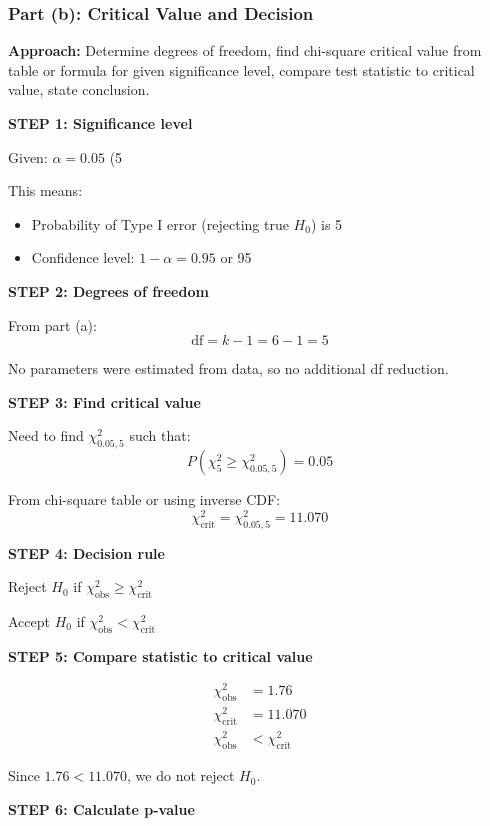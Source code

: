\documentclass[12pt]{article}
\begin{document}
\subsubsection{Part (b): Critical Value and Decision}

\begin{solution}

\textbf{Approach:} Determine degrees of freedom, find chi-square critical value from table or formula for given significance level, compare test statistic to critical value, state conclusion.

\textbf{STEP 1: Significance level}

Given: $\alpha = 0.05$ (5%

This means:
\begin{itemize}
    \item Probability of Type I error (rejecting true $H_0$) is 5%
    \item Confidence level: $1 - \alpha = 0.95$ or 95%
\end{itemize}

\textbf{STEP 2: Degrees of freedom}

From part (a):
\[
\text{df} = k - 1 = 6 - 1 = 5
\]

No parameters were estimated from data, so no additional df reduction.

\textbf{STEP 3: Find critical value}

Need to find $\chi^2_{0.05, 5}$ such that:
\[
P(\chi^2_5 \geq \chi^2_{0.05, 5}) = 0.05
\]

From chi-square table or using inverse CDF:
\[
\chi^2_{\text{crit}} = \chi^2_{0.05, 5} = 11.070
\]

\textbf{STEP 4: Decision rule}

Reject $H_0$ if $\chi^2_{\text{obs}} \geq \chi^2_{\text{crit}}$

Accept $H_0$ if $\chi^2_{\text{obs}} < \chi^2_{\text{crit}}$

\textbf{STEP 5: Compare statistic to critical value}

\begin{align*}
\chi^2_{\text{obs}} &= 1.76 \\
\chi^2_{\text{crit}} &= 11.070 \\
\chi^2_{\text{obs}} &< \chi^2_{\text{crit}}
\end{align*}

Since $1.76 < 11.070$, we do not reject $H_0$.

\textbf{STEP 6: Calculate p-value}


\end{solution}
\end{document}
